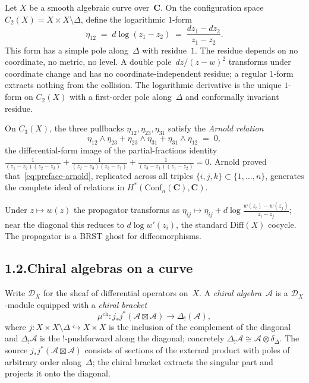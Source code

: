 \documentclass[11pt]{report}
\theoremstyle{definition}
\theoremstyle{remark}
\providecommand{\cA}{\mathcal{A}}
\numberwithin{equation}{section}
\begin{document}
Let $X$ be a smooth algebraic curve over~$\mathbf C$. On the
configuration space $C_2(X)=X\times X\setminus\Delta$, define the
logarithmic $1$-form
\begin{equation}\label{eq:preface-eta}
\eta_{12}\;=\;d\log(z_1-z_2)\;=\;\frac{dz_1-dz_2}{z_1-z_2}.
\end{equation}
This form has a simple pole along~$\Delta$ with residue~$1$. The
residue depends on no coordinate, no metric, no level. A double
pole~$dz/(z-w)^2$ transforms under coordinate change and has no
coordinate-independent residue; a regular $1$-form extracts nothing
from the collision. The logarithmic derivative is the unique $1$-form
on $C_2(X)$ with a first-order pole along~$\Delta$ and conformally
invariant residue.

On $C_3(X)$, the three pullbacks $\eta_{12}, \eta_{23}, \eta_{31}$
satisfy the \emph{Arnold relation}
\begin{equation}\label{eq:preface-arnold}
\eta_{12}\wedge\eta_{23}+\eta_{23}\wedge\eta_{31}+\eta_{31}\wedge\eta_{12}\;=\;0,
\end{equation}
the differential-form image of the partial-fractions identity
$\tfrac{1}{(z_1-z_2)(z_2-z_3)}+\tfrac{1}{(z_2-z_3)(z_3-z_1)}+\tfrac{1}{(z_3-z_1)(z_1-z_2)}=0$.
Arnold proved that~\eqref{eq:preface-arnold}, replicated across all
triples $\{i,j,k\}\subset\{1,\ldots,n\}$, generates the complete ideal
of relations in $H^*(\mathrm{Conf}_n(\mathbf C),\mathbf C)$.

Under $z\mapsto w(z)$ the propagator transforms as
$\eta_{ij}\mapsto\eta_{ij}+d\log\frac{w(z_i)-w(z_j)}{z_i-z_j}$;
near the diagonal this reduces to $d\log w'(z_i)$, the standard
$\mathrm{Diff}(X)$ cocycle. The propagator is a BRST ghost for
diffeomorphisms.

\subsection*{1.2.\enspace Chiral algebras on a curve}

Write $\mathcal D_X$ for the sheaf of differential operators on~$X$.
A \emph{chiral algebra}~$\cA$ is a $\mathcal D_X$-module equipped with
a \emph{chiral bracket}
\[
\mu^{\mathrm{ch}}\colon j_*j^*(\cA\boxtimes\cA)\longrightarrow\Delta_!(\cA),
\]
where $j\colon X\times X\setminus\Delta\hookrightarrow X\times X$ is
the inclusion of the complement of the diagonal and $\Delta_!\cA$ is
the $!$-pushforward along the diagonal; concretely $\Delta_!\cA\cong
\cA\otimes\delta_\Delta$. The source $j_*j^*(\cA\boxtimes\cA)$ consists
of sections of the external product with poles of arbitrary order
along~$\Delta$; the chiral bracket extracts the singular part and
projects it onto the diagonal.
\end{document}
